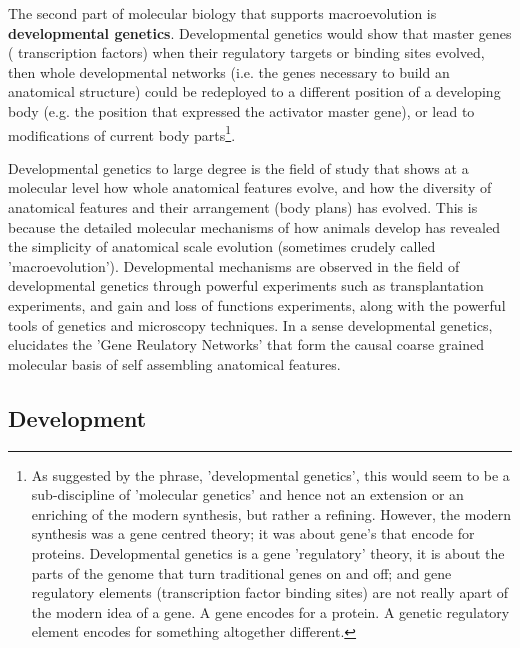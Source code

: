 The second part of molecular biology that supports macroevolution is \textbf{developmental genetics}. Developmental genetics would show that master genes ( transcription factors) when their regulatory targets or binding sites evolved, then whole developmental networks (i.e. the genes necessary to build an anatomical structure) could be redeployed to a different position of a developing body (e.g. the position that expressed the activator master gene), or lead to modifications of current body parts\footnote{As suggested by the phrase, 'developmental genetics', this would seem to be a sub-discipline of 'molecular genetics' and hence not an extension or an enriching of the modern synthesis, but rather a refining.  However, the modern synthesis was a gene centred theory; it was about gene's that encode for proteins.  Developmental genetics is a gene 'regulatory' theory, it is about the parts of the genome that turn traditional genes on and off; and gene regulatory elements (transcription factor binding sites) are not really apart of the modern idea of a gene.  A gene encodes for a protein.  A genetic regulatory element encodes for something altogether different.}.  

Developmental genetics to large degree is the field of study that shows at a molecular level how whole anatomical features evolve, and how the diversity of anatomical features and their arrangement (body plans) has evolved.  This is because the detailed molecular mechanisms of how animals develop has revealed the simplicity of anatomical scale evolution (sometimes crudely called 'macroevolution').  Developmental mechanisms are observed in the field of developmental genetics through powerful experiments such as transplantation experiments, and gain and loss of functions experiments, along with the powerful tools of genetics and microscopy techniques.  In a sense developmental genetics, elucidates the 'Gene Reulatory Networks' that form the causal coarse grained molecular basis of self assembling anatomical features. 
\subsection{Development}

